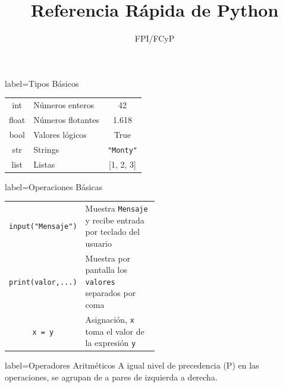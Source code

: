 \documentclass[10pt]{article}
\title{Referencia Rápida de Python}
\author{FPI/FCyP}
\begin{document}

\maketitle
\begin{multicols*}{3}

\begin{contentbox}{label=Tipos Básicos}
    \centering
    \begin{tabular}{C|l|C}
        int & Números enteros & 42\\
        float & Números flotantes & 1.618\\
        bool & Valores lógicos & True \\
        str & Strings & \lstinline!"Monty"! \\
        list & Listas & [1, 2, 3]
    \end{tabular}
\end{contentbox}

\begin{contentbox}{label=Operaciones Básicas}
    \begin{tabular}{C|p{0.5\linewidth}}
        \lstinline!input("Mensaje")! & Muestra \lstinline!Mensaje! y recibe entrada por teclado del usuario\\
        \lstinline!print(valor,...)! & Muestra por pantalla los \lstinline!valores! separados por coma \\
        \lstinline!x = y! & Asignación, \lstinline!x! toma el valor de la expresión \lstinline!y!
    \end{tabular}
\end{contentbox}

\begin{contentbox}{label=Operadores Aritméticos}
    A igual nivel de precedencia (P) en las operaciones, se agrupan de a pares de izquierda a derecha.


\end{contentbox}
\end{multicols*}
\end{document}
